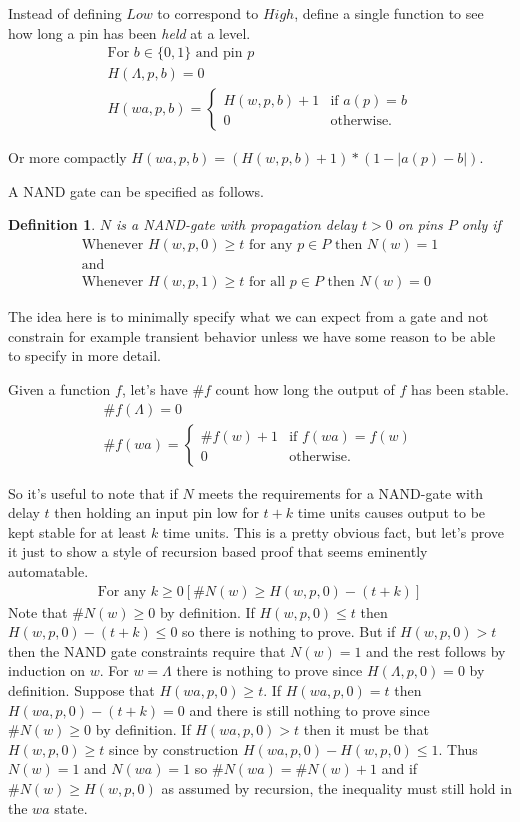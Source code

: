 \documentclass[runningheads,letter]{llncs}
\newcommand{\set}[1]{\{#1\}}
\newcommand{\ess}{\Lambda}
\newcommand{\Bfunc}{\left\{\begin{array}{ll}}
\newcommand{\Efunc}{\end{array}\right.}
\newtheorem{dfn}{Definition}[section]
\begin{document}
Instead of defining $Low$ to correspond to $High$, define a single function to see
how long a pin has been \emph{held} at a level.
\begin{eqnarray}
\mbox{For }b\in \set{0,1}\mbox{ and pin }p\nonumber \\
H(\ess,p,b)=0\\
H(wa,p,b)=\Bfunc  H(w,p,b)+1&\mbox{if }a(p)=b\\
                    0&\mbox{otherwise.}\Efunc \end{eqnarray}

Or more compactly $H(wa,p,b) = (H(w,p,b)+1)*(1 - |a(p)-b|)$.

A NAND gate can be specified as follows.
\begin{dfn} $N$ is a NAND-gate with propagation delay $t>0$ on pins $P$ only if
\begin{eqnarray}
\mbox{Whenever }H(w,p,0)\geq t \mbox{ for any }p\in P\mbox{ then }N(w)=1\label{cons:nand1}\\
\mbox{and }\nonumber \\
\mbox{Whenever }H(w,p,1)\geq t \mbox{ for all }p\in P\mbox{ then }N(w)=0\label{cons:nand2}
\end{eqnarray}
\end{dfn}

The idea here is to minimally specify what we can expect from a gate and not constrain 
for example transient behavior unless we have some reason to be able to specify in more detail.

Given a function $f$, let's have $\#f$ count how long the output of $f$ has been stable.
\begin{eqnarray}
\#f(\ess)=0\\
\#f(wa)=\Bfunc  \#f(w)+1&\mbox{if }f(wa)=f(w)\\
                    0&\mbox{otherwise.}\Efunc \label{pound}\end{eqnarray}

So it's useful to note that if $N$ meets the requirements for a NAND-gate with delay $t$
then holding an input pin low for $t+k$ time units causes output to be kept stable for at least
$k$ time units. This is a pretty obvious fact, but let's prove it just to show a style of recursion based
proof that seems eminently automatable.
\begin{eqnarray}
\mbox{For any }k\geq 0[ \#N(w) \geq H(w,p,0) - (t+k)]\label{lemma1}
\end{eqnarray}
Note that $\#N(w)\geq 0$ by definition. If $H(w,p,0)\leq t$ then $H(w,p,0)-(t+k) \leq 0$ so there is
nothing to prove. But if $H(w,p,0)>t$ then 
the NAND gate constraints require that $N(w)=1$ and the rest follows by induction on $w$.
For $w=\ess$ there is nothing to prove since $H(\ess,p,0)=0$ by definition.
Suppose that $H(wa,p,0)\geq t$. If $H(wa,p,0)=t$ then $H(wa,p,0)-(t+k)=0$ and there is still
nothing to prove since $\#N(w)\geq 0$ by definition.
If $H(wa,p,0)>t$ then it must be that $H(w,p,0)\geq t$ since by construction $H(wa,p,0)-H(w,p,0) \leq 1$. Thus
$N(w)=1$ and $N(wa)=1$ so $\#N(wa) = \#N(w)+1$ and if $\#N(w)\geq H(w,p,0)$ as assumed by recursion, the inequality must still
hold in the $wa$ state.
\end{document}
